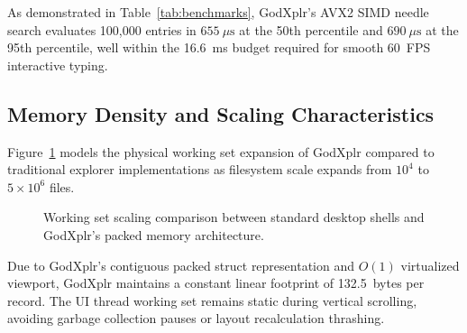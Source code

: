 \documentclass[conference]{IEEEtran}
\begin{document}
As demonstrated in Table~\ref{tab:benchmarks}, GodXplr's AVX2 SIMD needle search evaluates 100,000 entries in $655~\mu\text{s}$ at the 50th percentile and $690~\mu\text{s}$ at the 95th percentile, well within the 16.6~ms budget required for smooth 60~FPS interactive typing.

\subsection{Memory Density and Scaling Characteristics}
Figure~\ref{fig:memory_scaling} models the physical working set expansion of GodXplr compared to traditional explorer implementations as filesystem scale expands from $10^4$ to $5 \times 10^6$ files.

\begin{figure}[htbp]
\centering
{}
\caption{Working set scaling comparison between standard desktop shells and GodXplr's packed memory architecture.}
\label{fig:memory_scaling}
\end{figure}

Due to GodXplr's contiguous packed struct representation and $O(1)$ virtualized viewport, GodXplr maintains a constant linear footprint of 132.5~bytes per record. The UI thread working set remains static during vertical scrolling, avoiding garbage collection pauses or layout recalculation thrashing.
\end{document}
